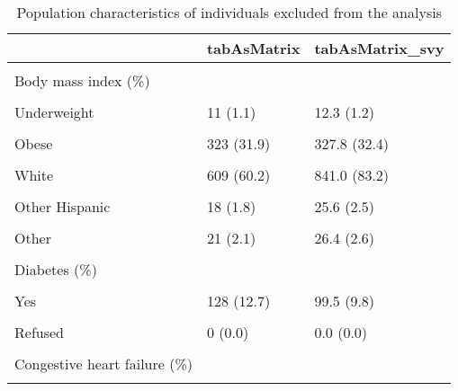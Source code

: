 \begin{table}[!h]

\caption{Population characteristics of individuals excluded from the analysis}
\centering
\begin{tabular}[t]{lll}
\toprule
  & tabAsMatrix & tabAsMatrix\_svy\\
\midrule
\cellcolor{gray!6}{n} & \cellcolor{gray!6}{1011} & \cellcolor{gray!6}{1011.0}\\
Body mass index (\%) &  & \\
\cellcolor{gray!6}{Normal} & \cellcolor{gray!6}{289 (28.6)} & \cellcolor{gray!6}{290.1 (28.7)}\\
Underweight & 11 (1.1) & 12.3 (1.2)\\
\cellcolor{gray!6}{Overweight} & \cellcolor{gray!6}{388 (38.4)} & \cellcolor{gray!6}{380.8 (37.7)}\\
\addlinespace
Obese & 323 (31.9) & 327.8 (32.4)\\
\cellcolor{gray!6}{Race (\%)} & \cellcolor{gray!6}{} & \cellcolor{gray!6}{}\\
White & 609 (60.2) & 841.0 (83.2)\\
\cellcolor{gray!6}{Mexican American} & \cellcolor{gray!6}{167 (16.5)} & \cellcolor{gray!6}{42.1 (4.2)}\\
Other Hispanic & 18 (1.8) & 25.6 (2.5)\\
\addlinespace
\cellcolor{gray!6}{Black} & \cellcolor{gray!6}{196 (19.4)} & \cellcolor{gray!6}{75.8 (7.5)}\\
Other & 21 (2.1) & 26.4 (2.6)\\
\cellcolor{gray!6}{Gender (\% Female)} & \cellcolor{gray!6}{462 (45.7)} & \cellcolor{gray!6}{518.4 (51.3)}\\
Diabetes (\%) &  & \\
\cellcolor{gray!6}{No} & \cellcolor{gray!6}{860 (85.1)} & \cellcolor{gray!6}{889.6 (88.0)}\\
\addlinespace
Yes & 128 (12.7) & 99.5 (9.8)\\
\cellcolor{gray!6}{Borderline} & \cellcolor{gray!6}{22 (2.2)} & \cellcolor{gray!6}{21.8 (2.2)}\\
Refused & 0 (0.0) & 0.0 \vphantom{5} (0.0)\\
\cellcolor{gray!6}{Don't know} & \cellcolor{gray!6}{1 (0.1)} & \cellcolor{gray!6}{0.1 (0.0)}\\
Congestive heart failure (\%) &  & \\
\addlinespace
\cellcolor{gray!6}{No} & \cellcolor{gray!6}{983 (97.2)} & \cellcolor{gray!6}{987.6 (97.7)}\\

\end{tabular}
\end{table}
